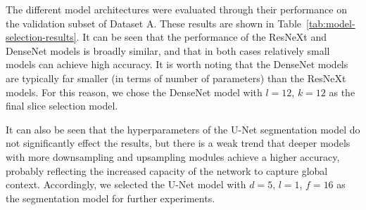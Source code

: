 \documentclass{llncs}
\begin{document}
The different model architectures were evaluated through their performance on the validation subset of Dataset A.
These results are shown in Table~\ref{tab:model-selection-results}.
It can be seen that the performance of the ResNeXt and DenseNet models is broadly similar, and that in both cases relatively small models can achieve high accuracy.
It is worth noting that the DenseNet models are typically far smaller (in terms of number of parameters) than the ResNeXt models.
For this reason, we chose the DenseNet model with $l=12$, $k=12$ as the final slice selection model.

It can also be seen that the hyperparameters of the U-Net segmentation model do not significantly effect the results, but there is a weak trend that deeper models with more downsampling and upsampling modules achieve a higher accuracy, probably reflecting the increased capacity of the network to capture global context.
Accordingly, we selected the U-Net model with $d=5$, $l=1$, $f=16$ as the segmentation model for further experiments.
\end{document}
